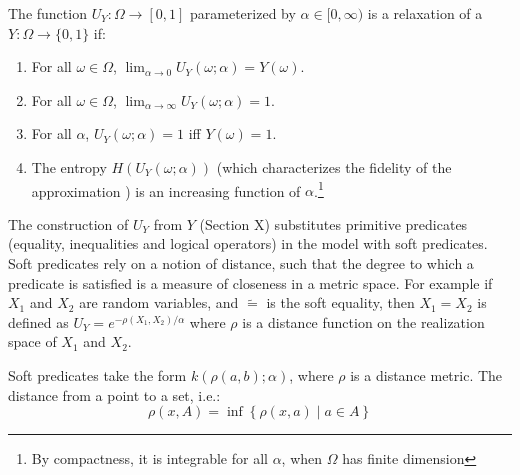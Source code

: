 
\begin{definition}
The function $U_Y : \Omega \to [0, 1]$ parameterized by $\alpha \in [0, \infty)$ is a relaxation of a $Y: \Omega \to \{0, 1\}$ if:
\begin{enumerate}[label=(\roman*)]
	\label{def:temp}
	\item For all $\omega \in \Omega$, $\lim_{\alpha \to 0}U_Y(\omega; \alpha) = Y(\omega)$.
	\item For all $\omega \in \Omega$, $\lim_{\alpha \to \infty}U_Y(\omega; \alpha) = 1$.

    \item For all $\alpha$, $U_Y(\omega; \alpha) = 1$ iff $Y(\omega) = 1$.
    \item The entropy $H(U_Y(\omega; \alpha))$ (which characterizes the fidelity of the approximation ) is an increasing function of $\alpha$.\footnote
    {By compactness, it is integrable for all $\alpha$, when $\Omega$ has finite dimension}
\end{enumerate}
\end{definition}


The construction of $U_Y$ from $Y$ (Section X) substitutes primitive predicates (equality, inequalities and logical operators) in the model with soft predicates.
Soft predicates rely on a notion of distance, such that the degree to which a predicate is satisfied is a measure of closeness in a metric space. 
For example if $X_1$ and $X_2$ are random variables, and $\tilde{=}$ is the soft equality, then $X_1 = X_2$ is defined as $U_Y = e^{-\rho(X_1, X_2) / \alpha}$ where $\rho$ is a distance function on the realization space of $X_1$ and $X_2$.

Soft  predicates take the form $k(\rho(a, b); \alpha)$, 
where $\rho$ is a distance metric.
The distance from a point to a set, i.e.:
$$
\rho(x, A) = \inf \left\{\rho(x, a) \mid a \in A\right\}
$$

